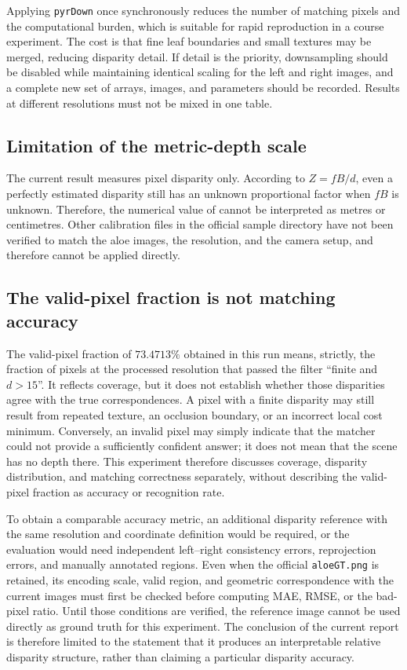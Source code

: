 Applying \texttt{pyrDown} once synchronously reduces the number of matching pixels and the computational burden, which is suitable for rapid reproduction in a course experiment. The cost is that fine leaf boundaries and small textures may be merged, reducing disparity detail. If detail is the priority, downsampling should be disabled while maintaining identical scaling for the left and right images, and a complete new set of arrays, images, and parameters should be recorded. Results at different resolutions must not be mixed in one table.

\subsection{Limitation of the metric-depth scale}

The current result measures pixel disparity only. According to $Z=fB/d$, even a perfectly estimated disparity still has an unknown proportional factor when $fB$ is unknown. Therefore, the numerical value of  cannot be interpreted as metres or centimetres. Other calibration files in the official sample directory have not been verified to match the aloe images, the resolution, and the camera setup, and therefore cannot be applied directly.

\subsection{The valid-pixel fraction is not matching accuracy}

The valid-pixel fraction of $73.4713\%$ obtained in this run means, strictly, the fraction of pixels at the processed resolution that passed the filter ``finite and $d>15$''. It reflects coverage, but it does not establish whether those disparities agree with the true correspondences. A pixel with a finite disparity may still result from repeated texture, an occlusion boundary, or an incorrect local cost minimum. Conversely, an invalid pixel may simply indicate that the matcher could not provide a sufficiently confident answer; it does not mean that the scene has no depth there. This experiment therefore discusses coverage, disparity distribution, and matching correctness separately, without describing the valid-pixel fraction as accuracy or recognition rate.

To obtain a comparable accuracy metric, an additional disparity reference with the same resolution and coordinate definition would be required, or the evaluation would need independent left--right consistency errors, reprojection errors, and manually annotated regions. Even when the official \texttt{aloeGT.png} is retained, its encoding scale, valid region, and geometric correspondence with the current images must first be checked before computing MAE, RMSE, or the bad-pixel ratio. Until those conditions are verified, the reference image cannot be used directly as ground truth for this experiment. The conclusion of the current report is therefore limited to the statement that it produces an interpretable relative disparity structure, rather than claiming a particular disparity accuracy.

